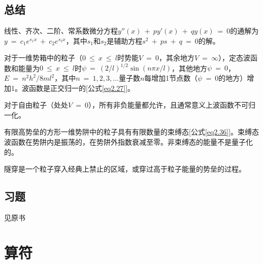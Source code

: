 \documentclass[12pt,a4paper,openany]{ctexbook}
\begin{document}
\section*{总结}
\begin{flushleft}
    \setlength{\parindent}{2em}
线性、齐次、二阶、常系数微分方程$y''(x)\ +\ py'(x)\ +\ qy(x)\ =\ 0$的通解为$y\ =\ c_1e^{s_1x}\ +\ c_2e^{s_2x}$，其中$s_1$和$s_2$是辅助方程$s^2\ +\ ps\ +\ q\ =\ 0$的解。

对于一维势箱中的粒子（$0\ \leq\ x\ \leq\ l$时势能$V\ =\ 0$，其余地方$V\ =\ \infty$），定态波函数和能量为$0\ \leq\ x\ \leq\ l$时$\psi\ =\ (2/l)^{1/2}\sin(n\pi x/l)$，其他地方$\psi\ =\ 0$，$E\ =\ n^2h^2/8ml^2$，其中$n\ =\ 1,2,3,\dots$量子数$n$每增加1节点数（$\psi\ =\ 0$的地方）增加1。波函数是正交归一的[公式\eqref{eq2.27}]。

对于自由粒子（处处$V\ =\ 0$），所有非负能量都允许，且通常意义上波函数不可归一化。

有限高势垒的方形一维势阱中的粒子具有有限数量的束缚态[公式\eqref{eq2.36}]。束缚态波函数在势阱内是振荡的，在势阱外指数衰减至零。非束缚态的能量不是量子化的。

隧穿是一个粒子穿入经典上禁止的区域，或穿过高于粒子能量的势垒的过程。
\end{flushleft}
\section*{习题}
见原书

\chapter{算符}
\end{document}
